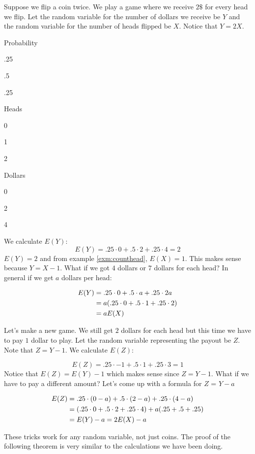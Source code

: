 \documentclass[
]{book}
\theoremstyle{definition}
\theoremstyle{definition}
\theoremstyle{definition}
\theoremstyle{remark}
\begin{document}
Suppose we flip a coin twice. We play a game where we receive \(2\$\) for every head we flip. Let the random variable for the number of dollars we receive be \(Y\) and the random variable for the number of heads flipped be \(X\). Notice that \(Y=2X\).

Probability

.25

.5

.25

Heads

0

1

2

Dollars

0

2

4

We calculate \(E(Y)\):
\[E(Y) = .25 \cdot 0 + .5 \cdot 2 + .25 \cdot 4 = 2\]
\(E(Y) = 2\) and from example \ref{exm:counthead}, \(E(X) = 1\). This makes sense because \(Y = X-1\). What if we got \(4\) dollars or \(7\) dollars for each head? In general if we get \(a\) dollars per head:

\begin{align}
E(Y) &= .25 \cdot 0 + .5 \cdot a + .25 \cdot 2a \notag \\
&= a(.25 \cdot 0 + .5 \cdot 1 + .25 \cdot 2) \notag \\
&= aE(X) \notag
\end{align}

Let's make a new game. We still get \(2\) dollars for each head but this time we have to pay \(1\) dollar to play. Let the random variable representing the payout be \(Z\). Note that \(Z=Y-1\). We calculate \(E(Z)\):

\[E(Z) = .25 \cdot {-1} + .5 \cdot 1 + .25 \cdot 3=1\]
Notice that \(E(Z) = E(Y) - 1\) which makes sense since \(Z = Y - 1\). What if we have to pay a different amount? Let's come up with a formula for \(Z\) = \(Y-a\)

\begin{align} 
E(Z) &= .25 \cdot (0-a) + .5 \cdot (2-a) + .25 \cdot (4-a) \notag \\
&= (.25 \cdot 0 + .5 \cdot 2 + .25 \cdot 4) + a(.25+.5+.25) \notag \\
&= E(Y) - a = 2E(X)-a \notag
\end{align}

These tricks work for any random variable, not just coins. The proof of the following theorem is very similar to the calculations we have been doing.
\end{document}
